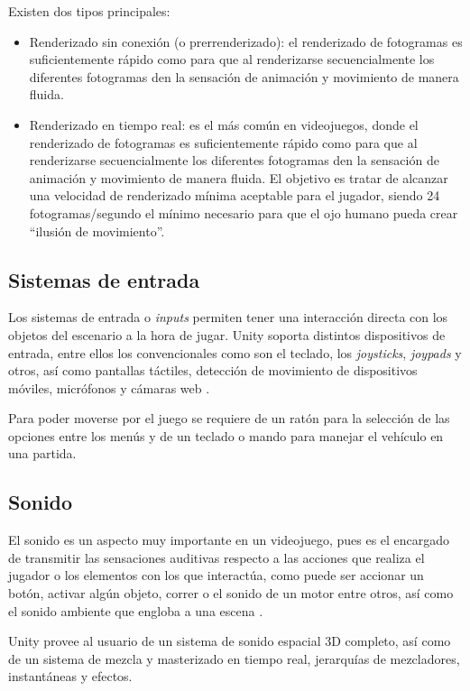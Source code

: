 Existen dos tipos principales:
\begin{itemize}
\tightlist
	\item Renderizado sin conexión (o prerrenderizado): el renderizado de fotogramas es suficientemente rápido como para que al renderizarse secuencialmente los diferentes fotogramas den la sensación de animación y movimiento de manera fluida.
	\item Renderizado en tiempo real: es el más común en videojuegos, donde el renderizado de fotogramas es suficientemente rápido como para que al renderizarse secuencialmente los diferentes fotogramas den la sensación de animación y movimiento de manera fluida. El objetivo es tratar de alcanzar una velocidad de renderizado mínima aceptable para el jugador, siendo 24 fotogramas/segundo el mínimo necesario para que el ojo humano pueda crear ``ilusión de movimiento''.
\end{itemize}

\subsection{Sistemas de entrada}

Los sistemas de entrada o \textit{inputs} permiten tener una interacción directa con los objetos del escenario a la hora de jugar. Unity soporta distintos dispositivos de entrada, entre ellos los convencionales como son el teclado, los \textit{joysticks}, \textit{joypads} y otros, así como pantallas táctiles, detección de movimiento de dispositivos móviles, micrófonos y cámaras web \cite{doc:input}.

Para poder moverse por el juego se requiere de un ratón para la selección de las opciones entre los menús y de un teclado o mando para manejar el vehículo en una partida.

\subsection{Sonido}

El sonido es un aspecto muy importante en un videojuego, pues es el encargado de transmitir las sensaciones auditivas respecto a las acciones que realiza el jugador o los elementos con los que interactúa, como puede ser accionar un botón, activar algún objeto, correr o el sonido de un motor entre otros, así como el sonido ambiente que engloba a una escena \cite{doc:sound}.

Unity provee al usuario de un sistema de sonido espacial 3D completo, así como de un sistema de mezcla y masterizado en tiempo real, jerarquías de mezcladores, instantáneas y efectos.

